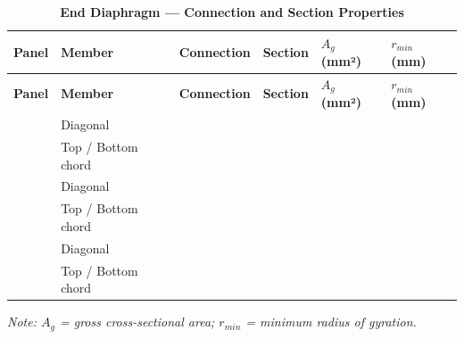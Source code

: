 \documentclass[12pt,a4paper]{report}
\numberwithin{table}{chapter}
\numberwithin{figure}{chapter}
\begin{document}
\begin{longtable}{|C{2.0cm}|L{2.0cm}|L{2.2cm}|C{2.5cm}|C{2.0cm}|C{2.0cm}|}
\caption{\textbf{End Diaphragm --- Connection and Section Properties}}
\hline
\textbf{Panel} & \textbf{Member} & \textbf{Connection} & \textbf{Section} & \textbf{$A_g$ (mm²)} & \textbf{$r_{min}$ (mm)} \\[6pt]
\hline

\endfirsthead
\hline
\textbf{Panel} & \textbf{Member} & \textbf{Connection} & \textbf{Section} & \textbf{$A_g$ (mm²)} & \textbf{$r_{min}$ (mm)} \\[6pt]
\hline
\endhead
{} & Diagonal &  &  &  &  \\[6pt]
 & Top / Bottom chord &  &  &  &  \\[6pt]
\hline
{} & Diagonal &  &  &  &  \\[6pt]
 & Top / Bottom chord &  &  &  &  \\[6pt]
\hline
{} & Diagonal &  &  &  &  \\[6pt]
 & Top / Bottom chord &  &  &  &  \\[6pt]
\hline
\end{longtable}
\noindent\textit{Note: $A_g$ = gross cross-sectional area; $r_{min}$ = minimum radius of gyration.}
\end{document}
